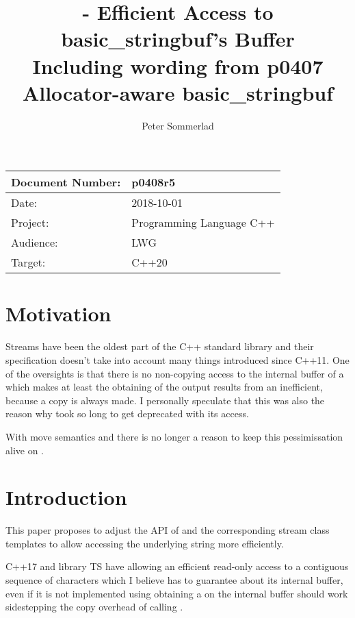 \documentclass[ebook,11pt,article]{memoir}
\title{\papernumber{} - Efficient Access to basic\_stringbuf's Buffer\\
Including wording from p0407 Allocator-aware basic\_stringbuf}
\author{Peter Sommerlad}
\date{\paperdate}                        %
\newcommand{\papernumber}{p0408r5}
\newcommand{\paperdate}{2018-10-01}
\begin{document}
\maketitle
\begin{tabular}[t]{|l|l|}\hline 
Document Number: & \papernumber  \\\hline
Date: & \paperdate \\\hline
Project: & Programming Language C++\\\hline 
Audience: & LWG\\\hline
Target: & C++20\\\hline
\end{tabular}

\chapter{Motivation}
Streams have been the oldest part of the C++ standard library and their specification doesn't take into account many things introduced since C++11. One of  the oversights is that there is no non-copying access to the internal buffer of a  which makes at least the obtaining of the output results from an  inefficient, because a copy is always made. I personally speculate that this was also the reason why  took so long to get deprecated with its  access.

With move semantics and  there is no longer a reason to keep this pessimissation alive on .


\chapter{Introduction}
This paper proposes to adjust the API of  and the corresponding stream class templates to allow accessing the underlying string more efficiently.

C++17 and library TS have  allowing an efficient read-only access to a contiguous sequence of characters which I believe  has to guarantee about its internal buffer, even if it is not implemented using  obtaining a  on the internal buffer should work sidestepping the copy overhead of calling . 
\end{document}
